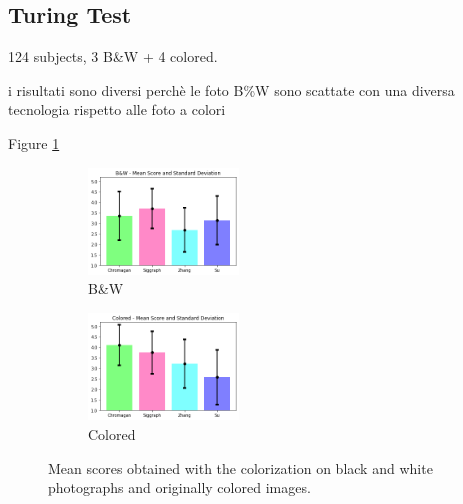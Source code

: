 \subsection{Turing Test}
124 subjects, 3 B\&W + 4 colored.

i risultati sono diversi perchè le foto B\%W sono scattate con una diversa tecnologia rispetto alle foto a colori

Figure \ref{fig:turing}
\begin{figure}[h]
	\centering
	\captionsetup[subfigure]{labelformat=empty}
	\begin{subfigure}[b]{0.1\textwidth}
		\begin{adjustwidth}{-1.1cm}{}
		\includegraphics[width=4cm]{bw turing.png}
		\end{adjustwidth}
	\caption{B\&W}
	\end{subfigure}
\hspace{2.3cm}
	\begin{subfigure}[b]{0.1\textwidth}
		\begin{adjustwidth}{-1.1cm}{}
			\includegraphics[width=4cm]{col turing.png}
		\end{adjustwidth}
		\caption{Colored}
	\end{subfigure}
	\caption{{\small Mean scores obtained with the colorization on black and white photographs and originally colored images.}}
	\label{fig:turing}
\end{figure}